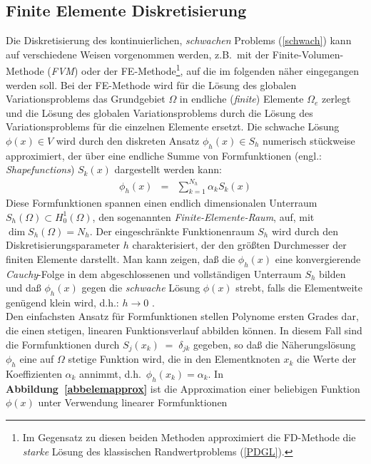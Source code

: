 \subsection{Finite Elemente Diskretisierung}
\label{diskretisierung}

Die Diskretisierung des kontinuierlichen, {\em schwachen} Problems
(\ref{schwach}) kann
auf verschiedene Weisen vorgenommen werden, z.B.\ mit der
Finite-Volumen-Methode ({\em FVM}) oder der FE-Methode\footnote{Im Gegensatz
zu diesen beiden Methoden approximiert die FD-Methode die {\em starke} Lösung
des klassischen Randwertproblems (\ref{PDGL}).}, auf die im folgenden
näher eingegangen werden soll. Bei der FE-Methode wird für die Lösung
des globalen Variationsproblems das Grundgebiet $\Omega$ in endliche
({\em finite}) Elemente $\Omega_{e}$ zerlegt und die Lösung des globalen
Variationsproblems durch die Lösung des Variationsproblems für die
einzelnen Elemente ersetzt. Die schwache Lösung $\phi(x) \in V$ wird durch
den diskreten Ansatz $\phi_{h}(x) \in S_{h}$ numerisch stückweise
approximiert, der über eine endliche Summe von Formfunktionen
(engl.: {\em Shapefunctions}) $S_{k}(x)$ dargestellt werden kann:
\begin{eqnarray}
\label{Sentw}
 \phi_{h}(x) & = & \sum_{k=1}^{N_{h}} \alpha_{k} S_{k}(x)
\end{eqnarray}
Diese Formfunktionen spannen einen endlich dimensionalen Unterraum
$S_{h}(\Omega) \subset H_{0}^{1}(\Omega)$, den sogenannten
{\em Finite-Elemente-Raum}, auf, mit $\dim S_{h}(\Omega) = N_{h}$.
Der eingeschränkte Funktionenraum $S_{h}$ wird durch den
Diskretisierungsparameter $h$ charakterisiert, der den größten Durchmesser
der finiten Elemente darstellt. Man kann zeigen, daß die $\phi_{h}(x)$ eine
konvergierende {\sl Cauchy}\/-Folge in dem abgeschlossenen und vollständigen
Unterraum $S_{h}$ bilden und daß $\phi_{h}(x)$ gegen die {\em schwache}
Lösung $\phi(x)$ strebt, falls die Elementweite genügend klein wird,
d.h.: $h \rightarrow 0$ \cite{Cia78}.\\
%
Den einfachsten Ansatz für Formfunktionen stellen Polynome ersten Grades
dar, die einen stetigen, linearen Funktionsverlauf abbilden können. In diesem
Fall sind die Formfunktionen durch $S_{j}(x_{k}) \; = \; \delta_{jk}$
gegeben, so daß die Näherungslösung $\phi_{h}$ eine %
auf $\Omega$ stetige Funktion wird, die in den Elementknoten $x_{k}$ die
Werte der Koeffizienten $\alpha_{k}$ annimmt, d.h.\
$\phi_{h}(x_{k})=\alpha_{k}$.
In {\bf Abbildung~\ref{abbelemapprox}} ist die Approximation einer
beliebigen Funktion $\phi(x)$ unter Verwendung linearer Formfunktionen
